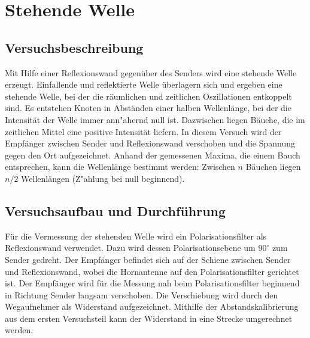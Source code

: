 \documentclass[12pt,a4paper]{article}
\begin{document}
\section{Stehende Welle}
\subsection{Versuchsbeschreibung}

Mit  Hilfe einer Reflexionswand gegenüber des Senders wird eine stehende Welle erzeugt. Einfallende und reflektierte Welle überlagern sich und ergeben eine stehende Welle, bei der die räumlichen und zeitlichen Oszillationen entkoppelt sind. Es entstehen Knoten in Abständen einer halben Wellenlänge, bei der die Intensität der Welle immer ann"ahernd null ist. Dazwischen liegen Bäuche, die im zeitlichen Mittel eine positive Intensität liefern. In diesem Versuch wird der Empfänger zwischen Sender und Reflexionswand verschoben und die Spannung gegen den Ort aufgezeichnet. Anhand der gemessenen Maxima, die einem Bauch entsprechen, kann die Wellenlänge bestimmt werden: Zwischen $n$ Bäuchen liegen $n/2$ Wellenlängen (Z"ahlung bei null beginnend).
\subsection{Versuchsaufbau und Durchführung}
Für die Vermessung der stehenden Welle wird ein Polarisationsfilter als Reflexionswand verwendet. Dazu wird dessen Polarisationsebene um $90^{\circ}$ zum Sender gedreht. Der Empfänger  befindet sich auf der Schiene zwischen Sender und Reflexionswand, wobei die Hornantenne auf den Polarisationsfilter gerichtet ist.
Der Empfänger wird für die Messung nah beim Polarisationsfilter beginnend in Richtung Sender langsam verschoben. Die Verschiebung wird durch den Wegaufnehmer als Widerstand aufgezeichnet. Mithilfe der Abstandskalibrierung aus dem ersten Versuchsteil kann der Widerstand in eine Strecke umgerechnet werden.
\end{document}
